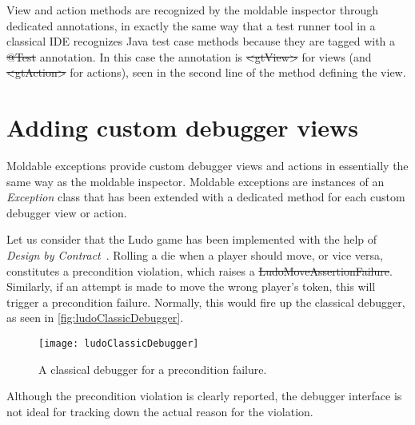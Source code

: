 \documentclass[sigplan,10pt]{acmart}
\newcommand\on[1]{\nbc{ON}{#1}{olive}} %
\begin{document}

View and action methods are recognized by the moldable inspector through dedicated annotations, in exactly the same way that a test runner tool in a classical IDE recognizes Java test case methods because they are tagged with a \st{@Test} annotation.
In this case the annotation is \st{<gtView>} for views (and \st{<gtAction>} for actions), seen in the second line of the method defining the view.

\section{Adding custom debugger views}\label{sec:views}

Moldable exceptions provide custom debugger views and actions in essentially the same way as the moldable inspector.
Moldable exceptions are instances of an \emph{Exception} class that has been extended with a dedicated method for each custom debugger view or action.

\on{fixed}

Let us consider that the Ludo game has been implemented with the help of \emph{Design by Contract}~\cite{Meye92b}.
Rolling a die when a player should move, or vice versa, constitutes a precondition violation, which raises a \st{LudoMoveAssertionFailure}.
Similarly, if an attempt is made to move the wrong player's token, this will trigger a precondition failure.
Normally, this would fire up the classical debugger, as seen in \autoref{fig:ludoClassicDebugger}.
\begin{figure}[h]
  \texttt{[image: ludoClassicDebugger]}
  \caption{A classical debugger for a precondition failure.}
  \label{fig:ludoClassicDebugger}
\end{figure}
Although the precondition violation is clearly reported, the debugger interface is not ideal for tracking down the actual reason for the violation.
\end{document}
